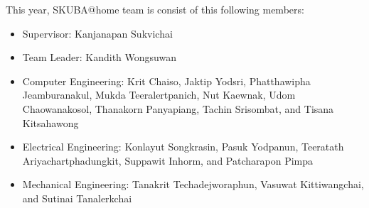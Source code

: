 \documentclass{llncs}
\begin{document}
This year, SKUBA@home team is consist of this following members:
\begin{itemize}
\item Supervisor: Kanjanapan Sukvichai
\item Team Leader: Kandith Wongsuwan
\item Computer Engineering: Krit Chaiso, Jaktip Yodsri, Phatthawipha Jeamburanakul, Mukda Teeralertpanich, Nut Kaewnak, Udom Chaowanakosol, Thanakorn Panyapiang, Tachin Srisombat, and Tisana Kitsahawong
\item Electrical Engineering: Konlayut Songkrasin, Pasuk Yodpanun, Teeratath Ariyachartphadungkit, Suppawit Inhorm, and Patcharapon Pimpa
\item Mechanical Engineering: Tanakrit Techadejworaphun, Vasuwat Kittiwangchai, and Sutinai Tanalerkchai
\end{itemize}
\end{document}
